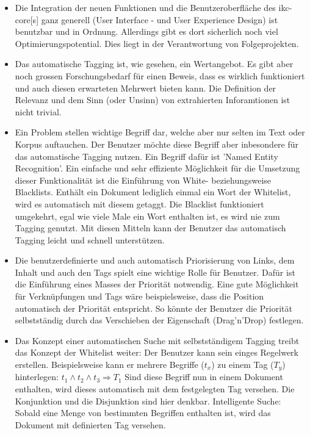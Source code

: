 \begin{itemize}
    \item Die Integration der neuen Funktionen und die Benutzeroberfläche des \gls{ikc-core}[s] ganz generell (User Interface - und User Experience Design) ist benutzbar und in Ordnung. Allerdings gibt es dort sicherlich noch viel Optimierungspotential. Dies liegt in der Verantwortung von Folgeprojekten.
    \item Das automatische Tagging ist, wie gesehen, ein Wertangebot. Es gibt aber noch grossen Forschungsbedarf für einen Beweis, dass es wirklich funktioniert und auch diesen erwarteten Mehrwert bieten kann. Die Definition der Relevanz und dem Sinn (oder Unsinn) von extrahierten Inforamtionen ist nicht trivial.
    \item Ein Problem stellen wichtige Begriff dar, welche aber nur selten im Text oder Korpus auftauchen. Der Benutzer möchte diese Begriff aber inbesondere für das automatische Tagging nutzen. Ein Begriff dafür ist 'Named Entity Recognition'. Ein einfache und sehr effiziente Möglichkeit für die Umsetzung dieser Funktionalität ist die Einführung von White- beziehungsweise Blacklists. Enthält ein Dokument lediglich einmal ein Wort der Whitelist, wird es automatisch mit diesem getaggt. Die Blacklist funktioniert umgekehrt, egal wie viele Male ein Wort enthalten ist, es wird nie zum Tagging genutzt. Mit diesen Mitteln kann der Benutzer das automatisch Tagging leicht und schnell unterstützen.
    \item Die benutzerdefinierte und auch automatisch Priorisierung von Links, dem Inhalt und auch den Tags spielt eine wichtige Rolle für Benutzer. Dafür ist die Einführung eines Masses der Priorität notwendig. Eine gute Möglichkeit für Verknüpfungen und Tags wäre beispielsweise, dass die Position automatisch der Priorität entspricht. So könnte der Benutzer die Priorität selbstständig durch das Verschieben der Eigenschaft (Drag'n'Drop) festlegen.
    \item Das Konzept einer automatischen Suche mit selbstständigem Tagging treibt das Konzept der Whitelist weiter: Der Benutzer kann sein einges Regelwerk erstellen. Beispielsweise kann er mehrere Begriffe ($t_x$) zu einem Tag ($T_y$) hinterlegen: $t_1\wedge t_2 \wedge t_3 \Rightarrow T_1$ Sind diese Begriff nun in einem Dokument enthalten, wird dieses automatisch mit dem festgelegten Tag versehen. Die Konjunktion und die Disjunktion sind hier denkbar.
    Intelligente Suche: Sobald eine Menge von bestimmten Begriffen enthalten ist, wird das Dokument mit definierten Tag versehen.

\end{itemize}
